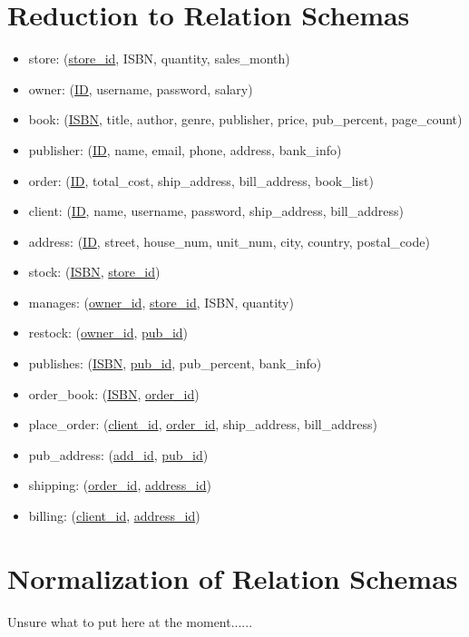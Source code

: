 \documentclass[Project Report]{article}
\begin{document}
\section{Reduction to Relation Schemas}
\begin{itemize}
    \item store: (\underline{store\_id}, ISBN, quantity, sales\_month)
    \item owner: (\underline{ID}, username, password, salary)
    \item book: (\underline{ISBN}, title, author, genre, publisher, price, pub\_percent, page\_count)
    \item publisher: (\underline{ID}, name, email, phone, address, bank\_info)
    \item order: (\underline{ID}, total\_cost, ship\_address, bill\_address, book\_list)
    \item client: (\underline{ID}, name, username, password, ship\_address, bill\_address)
    \item address: (\underline{ID}, street, house\_num, unit\_num, city, country, postal\_code)
    \item stock: (\underline{ISBN}, \underline{store\_id})
    \item manages: (\underline{owner\_id}, \underline{store\_id}, ISBN, quantity)
    \item restock: (\underline{owner\_id}, \underline{pub\_id})
    \item publishes: (\underline{ISBN}, \underline{pub\_id}, pub\_percent, bank\_info)
    \item order\_book: (\underline{ISBN}, \underline{order\_id})
    \item place\_order: (\underline{client\_id}, \underline{order\_id}, ship\_address, bill\_address)
    \item pub\_address: (\underline{add\_id}, \underline{pub\_id})
    \item shipping: (\underline{order\_id}, \underline{address\_id})
    \item billing: (\underline{client\_id}, \underline{address\_id})
\end{itemize}

\section{Normalization of Relation Schemas}
Unsure what to put here at the moment......
\end{document}

